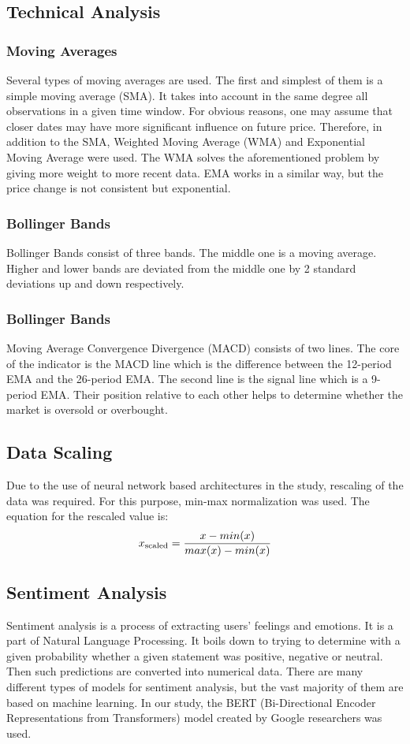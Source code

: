 \documentclass[11pt]{article} %
\begin{document}
\subsection{Technical Analysis}
\subsubsection{Moving Averages}
Several types of moving averages are used. The first and simplest of them is a simple moving average (SMA). It takes into account in the same degree all observations in a given time window. For obvious reasons, one may assume that closer dates may have more significant influence on future price. Therefore, in addition to the SMA, Weighted Moving Average (WMA) and Exponential Moving Average were used. The WMA solves the aforementioned problem by giving more weight to more recent data. EMA works in a similar way, but the price change is not consistent but exponential.

\subsubsection{Bollinger Bands}
Bollinger Bands consist of three bands. The middle one is a moving average. Higher and lower bands are deviated from the middle one by 2 standard deviations up and down respectively. 

\subsubsection{Bollinger Bands}
Moving Average Convergence Divergence (MACD) consists of two lines. The core of the indicator is the MACD line which is the difference between the 12-period EMA and the 26-period EMA. The second line is the signal line which is a 9-period EMA. Their position relative to each other helps to determine whether the market is oversold or overbought.


\subsection{Data Scaling}
Due to the use of neural network based architectures in the study, rescaling of the data was required. For this purpose, min-max normalization was used. The equation for the rescaled value is: 
\begin{equation} x\textsubscript{scaled} = \frac{x - min(x)}{max(x) - min(x)} \end{equation}

\subsection{Sentiment Analysis}
Sentiment analysis is a process of extracting users' feelings and emotions. It is a part of Natural Language Processing. It boils down to trying to determine with a given probability whether a given statement was positive, negative or neutral. Then such predictions are converted into numerical data. There are many different types of models for sentiment analysis, but the vast majority of them are based on machine learning. In our study, the BERT (Bi-Directional Encoder Representations from Transformers) model created by Google researchers was used. 
\end{document}
